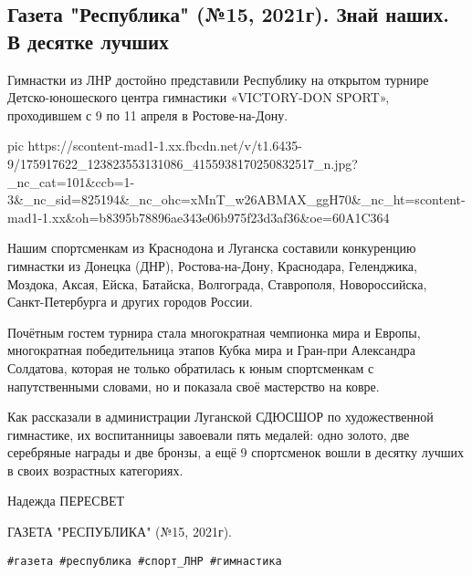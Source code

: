  
 
 
 
 

\subsection{Газета "Республика" (№15, 2021г).  Знай наших. В десятке лучших}
\label{sec:18_04_2021.fb.respublikalnr.1.sport_gimnastika}

Гимнастки из ЛНР достойно представили Республику на открытом турнире
Детско-юношеского центра гимнастики «VICTORY-DON SPORT», проходившем с 9 по 11
апреля в Ростове-на-Дону.

\ifcmt
  pic https://scontent-mad1-1.xx.fbcdn.net/v/t1.6435-9/175917622_123823553131086_4155938170250832517_n.jpg?_nc_cat=101&ccb=1-3&_nc_sid=825194&_nc_ohc=xMnT_w26ABMAX_ggH70&_nc_ht=scontent-mad1-1.xx&oh=b8395b78896ae343e06b975f23d3af36&oe=60A1C364
\fi

Нашим спортсменкам из Краснодона и Луганска составили конкуренцию гимнастки из
Донецка (ДНР), Ростова-на-Дону, Краснодара, Геленджика, Моздока, Аксая, Ейска,
Батайска, Волгограда, Ставрополя, Новороссийска, Санкт-Петербурга и других
городов России.

Почётным гостем турнира стала многократная чемпионка мира и Европы,
многократная победительница этапов Кубка мира и Гран-при Александра Солдатова,
которая не только обратилась к юным спортсменкам с напутственными словами, но и
показала своё мастерство на ковре. 

Как рассказали в администрации Луганской СДЮСШОР по художественной гимнастике,
их воспитанницы завоевали пять медалей: одно золото, две серебряные награды и
две бронзы, а ещё 9 спортсменок вошли в десятку лучших в своих возрастных
категориях.

Надежда ПЕРЕСВЕТ

ГАЗЕТА "РЕСПУБЛИКА" (№15, 2021г).

\verb|#газета #республика #спорт_ЛНР #гимнастика|
